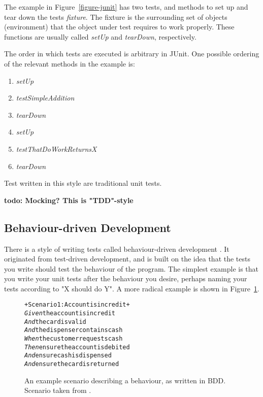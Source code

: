 \documentclass[a4paper,11pt]{kth-mag}
\newcommand{\todo}[1]{\textbf{todo: #1}}
\begin{document}
The example in Figure~\ref{figure-junit} has two tests, and methods to set up
and tear down the tests \textit{fixture}. The fixture is the surrounding set of
objects (environment) that the object under test requires to work properly.
These functions are usually called \textit{setUp} and \textit{tearDown},
respectively.

The order in which tests are executed is arbitrary in JUnit. One possible
ordering of the relevant methods in the example is:

\begin{enumerate}
	\item \textit{setUp}
	\item \textit{testSimpleAddition}
	\item \textit{tearDown}

	\item \textit{setUp}
	\item \textit{testThatDoWorkReturnsX}
	\item \textit{tearDown}
\end{enumerate}

Test written in this style are traditional unit tests. 

\todo{Mocking? This is "TDD"-style}

\subsection{Behaviour-driven Development}

There is a style of writing tests called behaviour-driven development
\cite{north06bdd}. It originated from test-driven development, and is built on
the idea that the tests you write should test the behaviour of the program. The
simplest example is that you write your unit tests after the behaviour you
desire, perhaps naming your tests according to "X should do Y". A more radical
example is shown in Figure~\ref{figure-bdd}.

\begin{figure}[h!]

\begin{alltt}
+Scenario 1: Account is in credit+
\textit{Given} the account is in credit
\textit{And} the card is valid
\textit{And} the dispenser contains cash
\textit{When} the customer requests cash
\textit{Then} ensure the account is debited
\textit{And} ensure cash is dispensed
\textit{And} ensure the card is returned
\end{alltt}

\caption{An example scenario describing a behaviour, as written in BDD.
Scenario taken from \cite{north06bdd}.}
\label{figure-bdd}
\end{figure}
\end{document}

